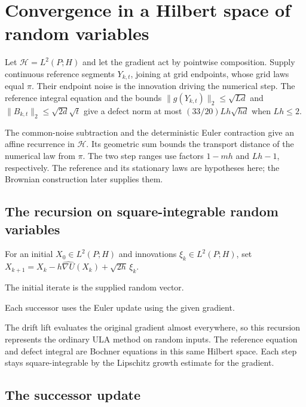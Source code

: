 \documentclass[11pt,a4paper]{report}
\begin{document}
\section{\texorpdfstring{Convergence in a Hilbert space of random variables}{Convergence in a Hilbert space of random variables}}
\label{proof-module-UnadjustedLangevin-HilbertDalalyan-lean}


Let \(\mathcal H=L^2(P;H)\) and let the gradient act by pointwise composition. Supply continuous reference segments \(Y_{k,t}\), joining at grid endpoints, whose grid laws equal \(\pi\). Their endpoint noise is the innovation driving the numerical step. The reference integral equation and the bounds \(\|g(Y_{k,t})\|_2\le\sqrt{Ld}\) and \(\|B_{k,t}\|_2\le\sqrt{2d}\sqrt t\) give a defect norm at most \((33/20)Lh\sqrt{hd}\) when \(Lh\le2\).



The common-noise subtraction and the deterministic Euler contraction give an affine recurrence in \(\mathcal H\). Its geometric sum bounds the transport distance of the numerical law from \(\pi\). The two step ranges use factors \(1-mh\) and \(Lh-1\), respectively. The reference and its stationary laws are hypotheses here; the Brownian construction later supplies them.

\subsection{\texorpdfstring{The recursion on square-integrable random variables}{The recursion on square-integrable random variables}}
\label{report-step-UnadjustedLangevin-HilbertDalalyan-lean-1}


For an initial \(X_0\in L^2(P;H)\) and innovations \(\xi_k\in L^2(P;H)\), set \(X_{k+1}=X_k-h\widehat{\nabla U}(X_k)+\sqrt{2h}\,\xi_k\).



The initial iterate is the supplied random vector.



Each successor uses the Euler update using the given gradient.



The drift lift evaluates the original gradient almost everywhere, so this recursion represents the ordinary ULA method on random inputs. The reference equation and defect integral are Bochner equations in this same Hilbert space. Each step stays square-integrable by the Lipschitz growth estimate for the gradient.

\subsection{\texorpdfstring{The successor update}{The successor update}}
\label{report-step-UnadjustedLangevin-HilbertDalalyan-lean-2}
\end{document}
